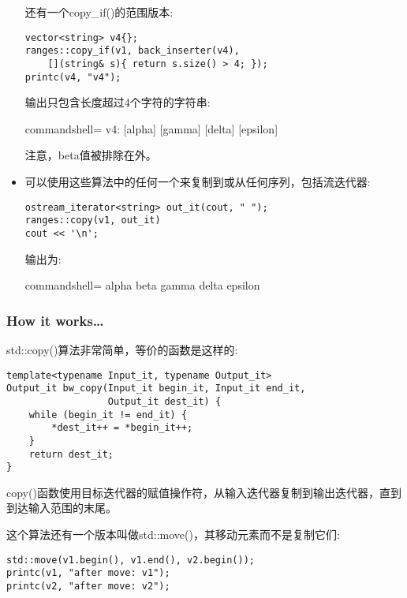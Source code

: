 \begin{itemize}
还有一个copy\_if()的范围版本:

\begin{lstlisting}[style=styleCXX]
vector<string> v4{};
ranges::copy_if(v1, back_inserter(v4),
	[](string& s){ return s.size() > 4; });
printc(v4, "v4");
\end{lstlisting}

输出只包含长度超过4个字符的字符串:

\begin{tcblisting}{commandshell={}}
v4: [alpha] [gamma] [delta] [epsilon]
\end{tcblisting}

注意，beta值被排除在外。

\item 
可以使用这些算法中的任何一个来复制到或从任何序列，包括流迭代器:

\begin{lstlisting}[style=styleCXX]
ostream_iterator<string> out_it(cout, " ");
ranges::copy(v1, out_it)
cout << '\n';
\end{lstlisting}

输出为:

\begin{tcblisting}{commandshell={}}
alpha beta gamma delta epsilon
\end{tcblisting}
\end{itemize}

\subsubsection{How it works…}

std::copy()算法非常简单，等价的函数是这样的:

\begin{lstlisting}[style=styleCXX]
template<typename Input_it, typename Output_it>
Output_it bw_copy(Input_it begin_it, Input_it end_it,
				  Output_it dest_it) {
	while (begin_it != end_it) {
		*dest_it++ = *begin_it++;
	}
	return dest_it;
}
\end{lstlisting}

copy()函数使用目标迭代器的赋值操作符，从输入迭代器复制到输出迭代器，直到到达输入范围的末尾。

这个算法还有一个版本叫做std::move()，其移动元素而不是复制它们:

\begin{lstlisting}[style=styleCXX]
std::move(v1.begin(), v1.end(), v2.begin());
printc(v1, "after move: v1");
printc(v2, "after move: v2");
\end{lstlisting}

